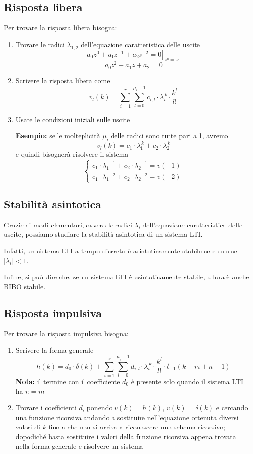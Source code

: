 \documentclass[a4paper,oneside,titlepage]{book}
\begin{document}
\subsection{Risposta libera}
Per trovare la risposta libera bisogna:
\begin{enumerate}
\item Trovare le radici $\lambda_{1,2}$ dell'equazione caratteristica delle uscite
\[ \left. a_0 z^0 + a_1 z^{-1} + a_2 z^{-2} = 0 \right|_{\cdot z^n = z^2} \]
\[ a_0 z^2 + a_1 z + a_2 = 0 \]

\item Scrivere la risposta libera come
\[ v_l(k) = \sum_{i=1}^r \sum_{l=0}^{\mu_i-1} c_{i,l} \cdot \lambda^{\,k}_i \cdot \frac{k^l}{l!} \]

\item Usare le condizioni iniziali sulle uscite

\textbf{Esempio:}
se le molteplicità $\mu_i$ delle radici sono tutte pari a 1, avremo
\[ v_l(k) = c_1 \cdot \lambda^{\,k}_1 + c_2 \cdot \lambda^{\,k}_2 \]
e quindi bisognerà risolvere il sistema
\[ \begin{cases}
c_1 \cdot \lambda^{\,-1}_1 + c_2 \cdot \lambda^{\,-1}_2 = v(-1) \\
c_1 \cdot \lambda^{\,-2}_1 + c_2 \cdot \lambda^{\,-2}_2 = v(-2)
\end{cases} \]
\end{enumerate}

\subsection{Stabilità asintotica}
Grazie ai modi elementari, ovvero le radici $\lambda_i$ dell'equazione caratteristica delle uscite, possiamo studiare la stabilità asintotica di un sistema LTI.

Infatti, un sistema LTI a tempo discreto è asintoticamente stabile se e solo se $|\lambda_i|<1$.

Infine, si può dire che: se un sistema LTI è asintoticamente stabile, allora è anche BIBO stabile.

\subsection{Risposta impulsiva}
Per trovare la risposta impulsiva bisogna:
\begin{enumerate}
\item Scrivere la forma generale
\[ h(k) = d_0 \cdot \delta(k) + \sum_{i=1}^r \sum_{l=0}^{\mu_i-1} d_{i,l} \cdot \lambda^{\,k}_i \cdot \frac{k^l}{l!} \cdot \delta_{-1}(k-m+n-1) \]
\textbf{Nota:}
il termine con il coefficiente $d_0$ è presente solo quando il sistema LTI ha $n = m$

\item Trovare i coefficienti $d_i$ ponendo $v(k) = h(k)$, $u(k) = \delta(k)$ e cercando una funzione ricorsiva andando a sostituire nell'equazione ottenuta diversi valori di $k$ fino a che non si arriva a riconoscere uno schema ricorsivo; dopodiché basta sostituire i valori della funzione ricorsiva appena trovata nella forma generale e risolvere un sistema
\end{enumerate}
\end{document}
